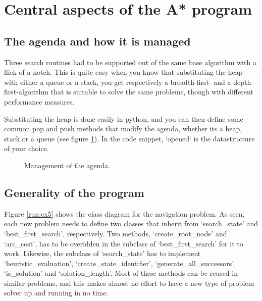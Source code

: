 \section{Central aspects of the A* program}
\subsection{The agenda and how it is managed}

Three search routines had to be supported out of the same base algorithm with a flick of a notch. This is quite easy when you know that substituting the heap with either a queue or a stack, you get respectively a breadth-first- and a depth-first-algorithm that is suitable to solve the same problems, though with different performance measures.

Substituting the heap is done easily in python, and you can then define some common pop and push methods that modify the agenda, whether its a heap, stack or a queue (see figure \ref{code:manage_agenda}). In the code snippet, `opened` is the datastructure of your choice.

\begin{figure}[h!]
	\centering
	
	\caption{Management of the agenda.}
	\label{code:manage_agenda}
\end{figure}

\subsection{Generality of the program}



Figure \ref{run:ex5} shows the class diagram for the navigation problem. As seen, each new problem needs to define two classes that inherit from `search\_state' and `best\_first\_search', respectively. Two methods, `create\_root\_node' and `arc\_cost', has to be overidden in the subclass of `best\_first\_search' for it to work. Likewise, the subclass of `search\_state' has to implement `heuristic\_evaluation', `create\_state\_identifier', `generate\_all\_successors', `is\_solution' and `solution\_length'. Most of these methods can be reused in similar problems, and this makes almost no effort to have a new type of problem solver up and running in no time.

